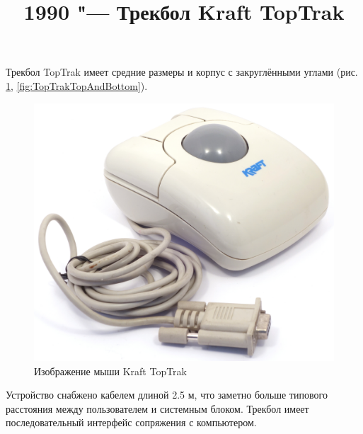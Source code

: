 \documentclass[11pt, a4paper]{article}
\begin{document}
\title{1990 "--- Трекбол Kraft TopTrak}
\date{}
\maketitle

Трекбол TopTrak имеет средние размеры и корпус с закруглёнными углами (рис. \ref{fig:TopTrakPic}, \ref{fig:TopTrakTopAndBottom}).

\begin{figure}[h]
    \centering
    \includegraphics[scale=0.45]{1990_kraft_toptrack/pic_60.jpg}
    \caption{Изображение мыши Kraft TopTrak}
    \label{fig:TopTrakPic}
\end{figure}

Устройство снабжено кабелем длиной 2.5 м, что заметно больше типового расстояния между пользователем и системным блоком. Трекбол имеет последовательный интерфейс сопряжения с компьютером.
\end{document}
